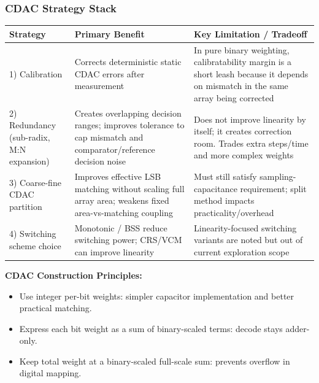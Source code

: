 \begin{frame}
  \frametitle{CDAC Strategy Stack}
  \tiny
  \begin{center}
    \begin{tabular}{p{2.2cm}|p{4.2cm}|p{4.8cm}}
      \hline
      \textbf{Strategy} & \textbf{Primary Benefit} & \textbf{Key Limitation / Tradeoff} \\
      \hline
      1) Calibration & %
      Corrects deterministic static CDAC errors after measurement &
      In pure binary weighting, calibratability margin is a short leash because it depends on mismatch in the same array being corrected \\
      \hline
      2) Redundancy (sub-radix, M:N expansion) & %
      Creates overlapping decision ranges; improves tolerance to cap mismatch and comparator/reference decision noise &
      Does not improve linearity by itself; it creates correction room. Trades extra steps/time and more complex weights \\
      \hline
      3) Coarse-fine CDAC partition & %
      Improves effective LSB matching without scaling full array area; weakens fixed area-vs-matching coupling &
      Must still satisfy sampling-capacitance requirement; split method impacts practicality/overhead \\
      \hline
      4) Switching scheme choice & %
      Monotonic / BSS reduce switching power; CRS/VCM can improve linearity &
      Linearity-focused switching variants are noted but out of current exploration scope \\
      \hline
    \end{tabular}
  \end{center}
  \vspace{0.2em}
  \tiny
  \textbf{CDAC Construction Principles:}
  \begin{itemize}
    \item Use integer per-bit weights: simpler capacitor implementation and better practical matching.
    \item Express each bit weight as a sum of binary-scaled terms: decode stays adder-only.
    \item Keep total weight at a binary-scaled full-scale sum: prevents overflow in digital mapping.
  \end{itemize}
\end{frame}

